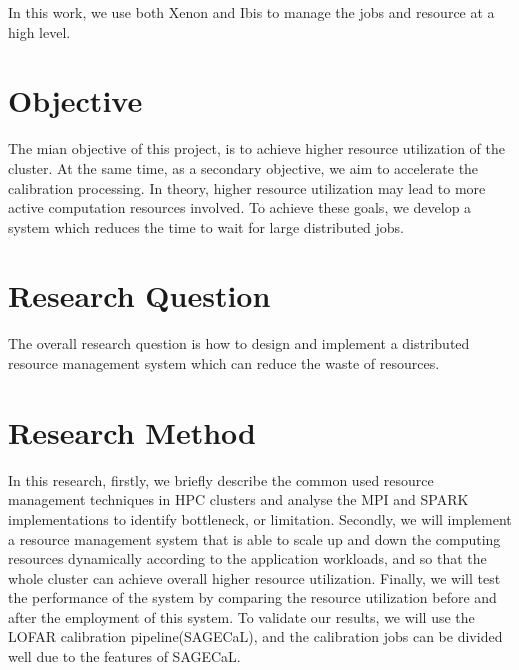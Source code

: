 In this work, we use both Xenon and Ibis to manage the jobs and resource at a high level.
\section{Objective}

The mian objective of this project, is to achieve higher resource utilization of the cluster. 
At the same time, as a secondary objective, we aim to accelerate the calibration processing. 
In theory, higher resource utilization may lead to more active computation resources involved. 
To achieve these goals, we develop a system which reduces the time to wait for large distributed jobs.
\section{Research Question}
The overall research question is how to design and implement a distributed resource management system which can reduce the waste of resources.

\section{Research Method}
In this research, firstly, we briefly describe the common used resource management techniques in HPC clusters and analyse the  MPI and SPARK implementations to identify bottleneck, or limitation.
Secondly, we will implement a resource management system that is able to scale up and down the computing resources dynamically according to the application workloads,  and so that the whole cluster can achieve overall higher resource utilization. 
Finally, we will test the performance of the system by comparing the resource utilization before and after the employment of this system. 
To validate our results, we will use the LOFAR calibration pipeline(SAGECaL), and the calibration jobs can be divided well due to the features of SAGECaL.
